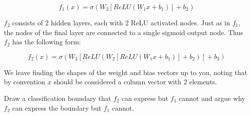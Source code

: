 \documentclass[submit]{harvardml}
\begin{document}
\begin{framed}
\begin{enumerate}
        $$
        f_1(x) = \sigma\left( W_2[ReLU(W_1 x + b_1)] + b_2 \right)
        $$
    
        $f_2$ consists of 2 hidden layers, each with 2 ReLU activated nodes. Just as in $f_1$, the 
        nodes of the final layer are connected to a single sigmoid output node. 
        Thus $f_2$ has the following form:
    
        $$
        f_2(x) = \sigma(W_3[ReLU(W_2[ReLU(W_1 x + b_1)]+b_2)]+ b_3)
        $$
    
        We leave finding the shapes of the weight and bias vectors up to you, noting that 
        by convention $x$ should be considered a column vector with 2 elements. 
    
        Draw a classification boundary that $f_2$ can express but $f_1$ cannot and argue 
        why $f_2$ can express the boundary but $f_1$ cannot.
    
    
    \end{enumerate}  
\end{framed}
\end{document}
